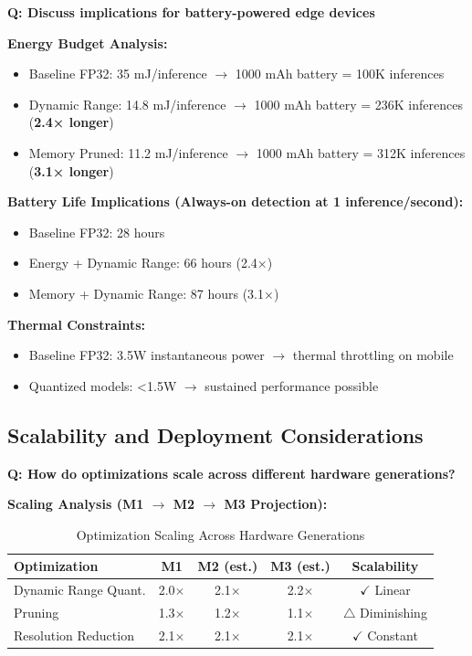 \documentclass[10pt, a4paper]{article}
\begin{document}
\textbf{Q: Discuss implications for battery-powered edge devices}

\textbf{Energy Budget Analysis:}
\begin{itemize}
    \item Baseline FP32: 35 mJ/inference $\rightarrow$ 1000 mAh battery = 100K inferences
    \item Dynamic Range: 14.8 mJ/inference $\rightarrow$ 1000 mAh battery = 236K inferences (\textbf{2.4× longer})
    \item Memory Pruned: 11.2 mJ/inference $\rightarrow$ 1000 mAh battery = 312K inferences (\textbf{3.1× longer})
\end{itemize}

\textbf{Battery Life Implications (Always-on detection at 1 inference/second):}
\begin{itemize}
    \item Baseline FP32: 28 hours
    \item Energy + Dynamic Range: 66 hours (2.4×)
    \item Memory + Dynamic Range: 87 hours (3.1×)
\end{itemize}

\textbf{Thermal Constraints:}
\begin{itemize}
    \item Baseline FP32: 3.5W instantaneous power $\rightarrow$ thermal throttling on mobile
    \item Quantized models: <1.5W $\rightarrow$ sustained performance possible
\end{itemize}

\subsection{Scalability and Deployment Considerations}

\textbf{Q: How do optimizations scale across different hardware generations?}

\textbf{Scaling Analysis (M1 $\rightarrow$ M2 $\rightarrow$ M3 Projection):}

\begin{table}[H]
\centering
\footnotesize
\begin{tabular}{|l|c|c|c|c|}
\hline
\textbf{Optimization} & \textbf{M1} & \textbf{M2 (est.)} & \textbf{M3 (est.)} & \textbf{Scalability} \\
\hline
Dynamic Range Quant. & 2.0$\times$ & 2.1$\times$ & 2.2$\times$ & $\checkmark$ Linear \\
Pruning & 1.3$\times$ & 1.2$\times$ & 1.1$\times$ & $\triangle$ Diminishing \\
Resolution Reduction & 2.1$\times$ & 2.1$\times$ & 2.1$\times$ & $\checkmark$ Constant \\
\hline
\end{tabular}
\caption{Optimization Scaling Across Hardware Generations}
\end{table}
\end{document}
